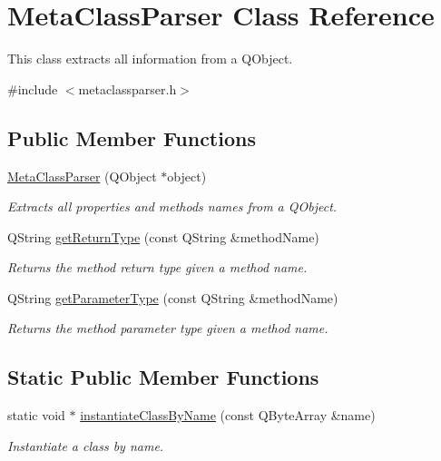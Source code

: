 \hypertarget{class_meta_class_parser}{}\section{Meta\+Class\+Parser Class Reference}
\label{class_meta_class_parser}


This class extracts all information from a Q\+Object.  




{\ttfamily \#include $<$metaclassparser.\+h$>$}

\subsection*{Public Member Functions}
\begin{DoxyCompactItemize}
\item 
\mbox{\hyperlink{class_meta_class_parser_ae3df53e78d823b2edaa38fe6184c9e01}{Meta\+Class\+Parser}} (Q\+Object $\ast$object)
\begin{DoxyCompactList}\small\item\em Extracts all properties and methods names from a Q\+Object. \end{DoxyCompactList}\item 
Q\+String \mbox{\hyperlink{class_meta_class_parser_adf9eefe961550b4aaa9432532f5723f4}{get\+Return\+Type}} (const Q\+String \&method\+Name)
\begin{DoxyCompactList}\small\item\em Returns the method return type given a method name. \end{DoxyCompactList}\item 
Q\+String \mbox{\hyperlink{class_meta_class_parser_ada953748a39a39968054231128a08667}{get\+Parameter\+Type}} (const Q\+String \&method\+Name)
\begin{DoxyCompactList}\small\item\em Returns the method parameter type given a method name. \end{DoxyCompactList}\end{DoxyCompactItemize}
\subsection*{Static Public Member Functions}
\begin{DoxyCompactItemize}
\item 
static void $\ast$ \mbox{\hyperlink{class_meta_class_parser_a1441f0bf6e0db301ea726279d535c49b}{instantiate\+Class\+By\+Name}} (const Q\+Byte\+Array \&name)
\begin{DoxyCompactList}\small\item\em Instantiate a class by name. \end{DoxyCompactList}\end{DoxyCompactItemize}
